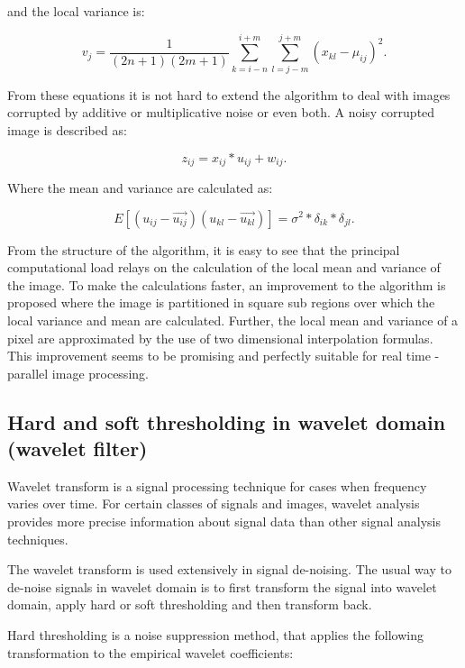 and the local variance is:

\begin{equation}
    v_{j} =\dfrac{1}{(2n+1)(2m+1)} \sum_{k=i-n}^{i+m}\sum_{l=j-m}^{j+m} (x_{kl} - \mu_{ij} )^2.
    \label{eq:ls_filter_2}
\end{equation}

From these equations it is not hard to extend the algorithm to deal with images corrupted by additive or multiplicative noise or even both. A noisy corrupted image is described as: 

\begin{equation}
z_{ij} = x_{ij}*u_{ij} + w_{ij}.
    \label{eq:ls_filter_3}
\end{equation}

Where the mean and variance are calculated as:

\begin{equation}
    E[(u_{ij} - \vec{u_{ij}})( u_{kl} -\vec{u_{kl}})] = \sigma^2*\delta_{ik}*\delta_{jl}.
    \label{eq:ls_filter_4}
\end{equation}

From the structure of the algorithm, it is easy to see that the principal computational load relays on the calculation of the local mean and variance of the image. To make the calculations faster, an improvement to the algorithm is proposed where the image is partitioned in square sub regions over which the local variance and mean are calculated. Further, the local mean and variance of a pixel are approximated by the use of two dimensional interpolation formulas. This improvement seems to be promising and perfectly suitable for real time -parallel image processing.

\subsection{Hard and soft thresholding in wavelet domain (wavelet filter)}
Wavelet transform is a signal processing technique for cases when frequency varies over time. For certain classes of signals and images, wavelet analysis provides more precise information about signal data than other signal analysis techniques.

The wavelet transform is used extensively in signal de-noising. The usual way to de-noise signals in wavelet domain is to first transform the signal into wavelet domain, apply hard or soft thresholding and then transform back. 

Hard thresholding is a noise suppression method, that applies the following transformation to the empirical wavelet coefficients:

